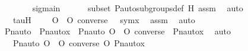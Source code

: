 \begin{isabellebody}
\isanewline
\ \ \ \ \ \ \isamarkupfalse%
\ sigmain\ {\isacharcolon}{\kern0pt}\ {\isachardoublequoteopen}{\isasymsigma}\ {\isasymin}\ {\isasymG}{\isachardoublequoteclose}\ \isamarkupfalse%
\ {\isasymF}{\isacharunderscore}{\kern0pt}subset\ P{\isacharunderscore}{\kern0pt}auto{\isacharunderscore}{\kern0pt}subgroups{\isacharunderscore}{\kern0pt}def\ H{}\ assm\ \isamarkupfalse%
\ auto\isanewline
\isanewline
\ \ \ \ \ \ \isamarkupfalse%
\ {\isasymtau}\ \ tauH\ {\isacharcolon}{\kern0pt}\ {\isachardoublequoteopen}{\isasymsigma}\ {\isacharequal}{\kern0pt}\ {\isasympi}\ O\ {\isasymtau}\ O\ converse{\isacharparenleft}{\kern0pt}{\isasympi}{\isacharparenright}{\kern0pt}{\isachardoublequoteclose}\ {\isachardoublequoteopen}{\isasymtau}\ {\isasymin}\ sym{\isacharparenleft}{\kern0pt}x{\isacharparenright}{\kern0pt}{\isachardoublequoteclose}\ \isamarkupfalse%
\ assm\ \isamarkupfalse%
\ auto\ \isanewline
\isanewline
\ \ \ \ \ \ \isamarkupfalse%
\ \isamarkupfalse%
\ {\isachardoublequoteopen}Pn{\isacharunderscore}{\kern0pt}auto{\isacharparenleft}{\kern0pt}{\isasymsigma}{\isacharparenright}{\kern0pt}\ {\isacharbackquote}{\kern0pt}\ {\isacharparenleft}{\kern0pt}Pn{\isacharunderscore}{\kern0pt}auto{\isacharparenleft}{\kern0pt}{\isasympi}{\isacharparenright}{\kern0pt}{\isacharbackquote}{\kern0pt}x{\isacharparenright}{\kern0pt}\ {\isacharequal}{\kern0pt}\ Pn{\isacharunderscore}{\kern0pt}auto{\isacharparenleft}{\kern0pt}{\isasympi}\ O\ {\isasymtau}\ O\ converse{\isacharparenleft}{\kern0pt}{\isasympi}{\isacharparenright}{\kern0pt}{\isacharparenright}{\kern0pt}\ {\isacharbackquote}{\kern0pt}\ {\isacharparenleft}{\kern0pt}Pn{\isacharunderscore}{\kern0pt}auto{\isacharparenleft}{\kern0pt}{\isasympi}{\isacharparenright}{\kern0pt}{\isacharbackquote}{\kern0pt}x{\isacharparenright}{\kern0pt}{\isachardoublequoteclose}\ \isamarkupfalse%
\ auto\ \isanewline
\ \ \ \ \ \ \isamarkupfalse%
\ \isamarkupfalse%
\ {\isachardoublequoteopen}{\isachardot}{\kern0pt}{\isachardot}{\kern0pt}{\isachardot}{\kern0pt}\ {\isacharequal}{\kern0pt}\ {\isacharparenleft}{\kern0pt}Pn{\isacharunderscore}{\kern0pt}auto{\isacharparenleft}{\kern0pt}{\isasympi}\ O\ {\isasymtau}\ O\ converse{\isacharparenleft}{\kern0pt}{\isasympi}{\isacharparenright}{\kern0pt}{\isacharparenright}{\kern0pt}\ O\ Pn{\isacharunderscore}{\kern0pt}auto{\isacharparenleft}{\kern0pt}{\isasympi}{\isacharparenright}{\kern0pt}{\isacharparenright}{\kern0pt}{\isacharbackquote}{\kern0pt}x{\isachardoublequoteclose}\ \isanewline

\end{isabellebody}
